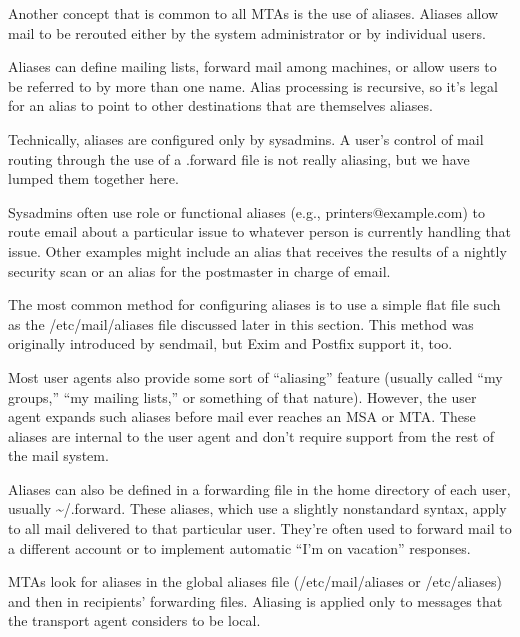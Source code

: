 \protect\hypertarget{part0026_split_018.htmlux5cux23_idIndexMarker2467}{}{}Another
concept that is common to all MTAs is the use of aliases. Aliases allow
mail to be rerouted either by the system administrator or by individual
users.

Aliases can define mailing lists, forward mail among machines, or allow
users to be referred to by more than one name. Alias processing is
recursive, so it's legal for an alias to point to other destinations
that are themselves aliases.

Technically, aliases are configured only by sysadmins. A user's control
of mail routing through the use of a {.forward} file is not really
aliasing, but we have lumped them together here.

Sysadmins often use role or functional aliases (e.g.,
printers@example.com) to route email about a particular issue to
whatever person is currently handling that issue. Other examples might
include an alias that receives the results of a nightly security scan or
an alias for the postmaster in charge of email.

The most common method for configuring aliases is to use a simple flat
file such as the
\protect\hypertarget{part0026_split_018.htmlux5cux23_idIndexMarker2468}{}{}{/etc/mail/aliases}
file discussed later in this section. This method was originally
introduced by {sendmail}, but Exim and Postfix support it, too.

Most user agents also provide some sort of ``aliasing'' feature (usually
called ``my groups,'' ``my mailing lists,'' or something of that
nature). However, the user agent expands such aliases before mail ever
reaches an MSA or MTA. These aliases are internal to the user agent and
don't require support from the rest of the mail system.

\protect\hypertarget{part0026_split_018.htmlux5cux23_idIndexMarker2469}{}{}Aliases
can also be defined in a forwarding file in the home directory of each
user, usually
\protect\hypertarget{part0026_split_018.htmlux5cux23_idIndexMarker2470}{}{}{\textasciitilde/.forward}.
These aliases, which use a slightly nonstandard syntax, apply to all
mail delivered to that particular user. They're often used to forward
mail to a different account or to implement automatic ``I'm on
vacation'' responses.

MTAs look for aliases in the global {aliases} file ({/etc/mail/aliases}
or {/etc/aliases}) and then in recipients' forwarding files. Aliasing is
applied only to messages that the transport agent considers to be local.

